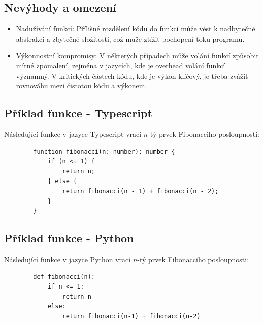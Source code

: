 \documentclass{article}
\begin{document}
\begin{Čistý kód - Funkce}
        \subsection{Nevýhody a omezení}\label{subsec:nevyhody-a-omezeni}
        \begin{itemize}
            \item Nadužívání funkcí: Přílišné rozdělení kódu do funkcí může vést k nadbytečné abstrakci a zbytečné složitosti, což může ztížit pochopení toku programu.
            \item Výkonnostní kompromisy: V některých případech může volání funkcí způsobit mírné zpomalení, zejména v jazycích, kde je overhead volání funkcí významný.
            V kritických částech kódu, kde je výkon klíčový, je třeba zvážit rovnováhu mezi čistotou kódu a výkonem.
        \end{itemize}

        \break

        \subsection{Příklad funkce - Typescript}\label{subsec:priklad-funkce---typescript}
        Následující funkce v jazyce Typescript vrací \(n\)-tý prvek Fibonacciho posloupnosti:
        \begin{verbatim}
        function fibonacci(n: number): number {
            if (n <= 1) {
                return n;
            } else {
                return fibonacci(n - 1) + fibonacci(n - 2);
            }
        }
        \end{verbatim}

        \subsection{Příklad funkce - Python}\label{subsec:priklad-funkce---python}
        Následující funkce v jazyce Python vrací \(n\)-tý prvek Fibonacciho posloupnosti:
        \begin{verbatim}
        def fibonacci(n):
            if n <= 1:
                return n
            else:
                return fibonacci(n-1) + fibonacci(n-2)
        \end{verbatim}
    \end{Čistý kód - Funkce}

    \break
\end{document}
